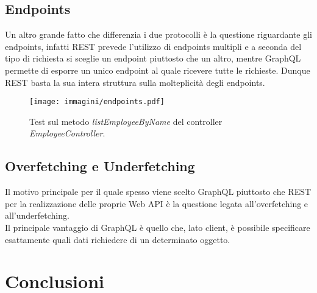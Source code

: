 \subsection{Endpoints}
Un altro grande fatto che differenzia i due protocolli è la questione riguardante gli endpoints, infatti REST prevede l'utilizzo di endpoints multipli e a seconda del tipo di richiesta si sceglie un endpoint piuttosto che un altro, mentre GraphQL permette di esporre un unico endpoint al quale ricevere tutte le richieste. Dunque REST basta la sua intera struttura sulla molteplicità degli endpoints.\\
\FloatBarrier
\begin{figure}[!ht]
\centering
\texttt{[image: immagini/endpoints.pdf]}
\caption{Test sul metodo \textit{listEmployeeByName} del controller \textit{EmployeeController}.}
\label{endpoints}
\end{figure}
\FloatBarrier

\subsection{Overfetching e Underfetching}
Il motivo principale per il quale spesso viene scelto GraphQL piuttosto che REST per la realizzazione delle proprie Web API è la questione legata all'overfetching e all'underfetching.\\
Il principale vantaggio di GraphQL è quello che, lato client, è possibile specificare esattamente quali dati richiedere di un determinato oggetto.
\section{Conclusioni}






